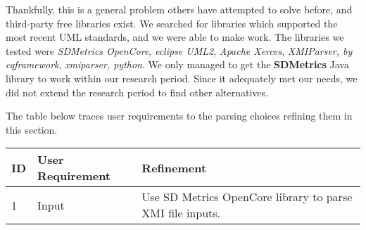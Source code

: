 \documentclass[11pt]{article}
\begin{document}
    Thankfully, this is a general problem others have attempted to solve before, and third-party free libraries exist.
    We searched for libraries which supported the most recent UML standards, and we were able to make work.
    The libraries we tested were \textit{SDMetrics OpenCore},
    \textit{eclipse UML2}, \textit{Apache Xerces}, \textit{XMIParser, by cqframework}, \textit{xmiparser, python}.
    We only managed to get the \textbf{SDMetrics} Java library to work within our research period.
    Since it adequately met our needs, we did not extend the research period to find other alternatives.

    The table below traces user requirements to the parsing choices refining them in this section.
    \begin{table}[htbp]
        \centering
        \begin{tabularx}{\textwidth}{| l | l | X |}
            \hline
            \textbf{ID} & \textbf{User Requirement} & \textbf{Refinement} \\
            \hline
            1 & Input & Use SD Metrics OpenCore library to parse XMI file inputs. \\ \hline
        \end{tabularx}\label{tab:parse-choice-table}
    \end{table}
\end{document}
